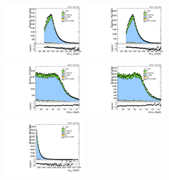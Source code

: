 \begin{figure}[htbp]
  \centering
  \includegraphics[width=0.3825\textwidth]{fig/controlPlots/SB_b1_mu_allP_allC_allD_Run2_lnujj_l1_pt.pdf}
  \includegraphics[width=0.3825\textwidth]{fig/controlPlots/SB_b1_e_allP_allC_allD_Run2_lnujj_l1_pt.pdf}\\
  \includegraphics[width=0.3825\textwidth]{fig/controlPlots/SB_b1_mu_allP_allC_allD_Run2_lnujj_l1_mt.pdf}
  \includegraphics[width=0.3825\textwidth]{fig/controlPlots/SB_b1_e_allP_allC_allD_Run2_lnujj_l1_mt.pdf}\\
  \includegraphics[width=0.3825\textwidth]{fig/controlPlots/SB_b1_mu_allP_allC_allD_Run2_mWV.pdf}

\end{figure}
